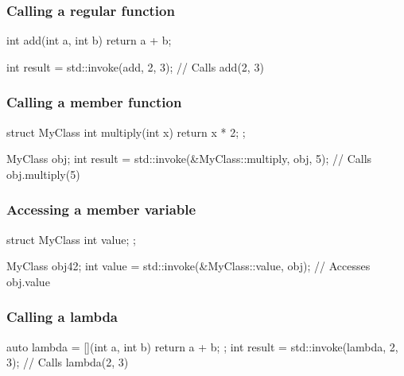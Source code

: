 \documentclass{report}
\begin{document}
     \bigbreak \noindent 
     \subsubsection{Calling a regular function}
     \bigbreak \noindent 
     \begin{cppcode}
         int add(int a, int b) {
             return a + b;
         }

         int result = std::invoke(add, 2, 3);  // Calls add(2, 3)
     \end{cppcode}

     \bigbreak \noindent 
     \subsubsection{Calling a member function}
     \bigbreak \noindent 
     \begin{cppcode}
         struct MyClass {
             int multiply(int x) { return x * 2; }
         };

         MyClass obj;
         int result = std::invoke(&MyClass::multiply, obj, 5);  // Calls obj.multiply(5)
     \end{cppcode}
     \pagebreak \bigbreak \noindent 
     \subsubsection{Accessing a member variable}
     \bigbreak \noindent 
     \begin{cppcode}
         struct MyClass {
             int value;
         };

         MyClass obj{42};
         int value = std::invoke(&MyClass::value, obj);  // Accesses obj.value
     \end{cppcode}

     \bigbreak \noindent 
     \subsubsection{Calling a lambda}
     \bigbreak \noindent 
     \begin{cppcode}
         auto lambda = [](int a, int b) { return a + b; };
         int result = std::invoke(lambda, 2, 3);  // Calls lambda(2, 3)
     \end{cppcode}

     \pagebreak 
\end{document}

